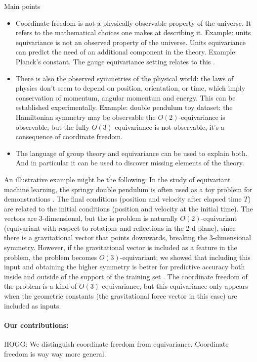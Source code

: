 \documentclass[12pt]{article}
\begin{document}
Main points
\begin{itemize}
    \item Coordinate freedom is not a physically observable property of the universe. It refers to the mathematical choices one makes at describing it.
    Example: units equivariance is not an observed property of the universe. Units equivariance can predict the need of an additional component in the theory. Example: Planck's constant. The gauge equivariance setting relates to this \cite{weiler}.
    \item There is also the observed symmetries of the physical world: the laws of physics don't seem to depend on position, orientation, or time, which imply conservation of momentum, angular momentum and energy. This can be established experimentally. Example:  double pendulum toy dataset: the Hamiltonian symmetry may be observable the $O(2)$-equivariance is observable, but the fully $O(3)$-equivariance is not observable, it's a consequence of coordinate freedom. 
    \item The language of group theory and equivariance can be used to explain both. And in particular it can be used to discover missing elements of the theory.
\end{itemize}

An illustrative example might be the following:
In the study of equivariant machine learning, the springy double pendulum is often used as a toy problem for demonstrations \cite{Finzi}.
The final conditions (position and velocity after elapsed time $T$) are related to the initial conditions (position and velocity at the initial time).
The vectors are 3-dimensional, but the is problem is naturally $O(2)$-equivariant (equivariant with respect to rotations and reflections in the 2-d plane), since there is a gravitational vector that points downwards, breaking the 3-dimensional symmetry.
However, if the gravitational vector is included as a feature in the problem, the problem becomes $O(3)$-equivariant; we showed that including this input and obtaining the higher symmetry is better for predictive accuracy both inside and outside of the support of the training set \cite{Yao}.
The coordinate freedom of the problem is a kind of $O(3)$ equivariance, but this equivariance only appears when the geometric constants (the gravitational force vector in this case) are included as inputs.

\paragraph{Our contributions:}
HOGG: We distinguish coordinate freedom from equivariance. Coordinate freedom is way way more general.
\end{document}
